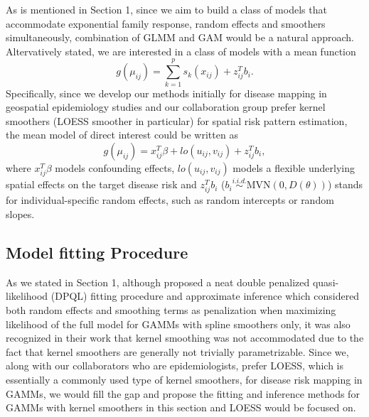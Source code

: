 	As is mentioned in Section 1, since we aim to build a class of models that accommodate exponential family response, random effects and smoothers simultaneously, combination of GLMM and GAM would be a natural approach. Altervatively stated, we are interested in a class of models with a mean function\begin{equation} \label{mod:GGAMM}
	g(\mu_{ij})=\sum_{k=1}^p s_k(x_{ij}) + z_{ij}^Tb_i.
	\end{equation} 
	Specifically, since we develop our methods initially for disease mapping in geospatial epidemiology studies and our collaboration group prefer kernel smoothers (LOESS smoother in particular) for spatial risk pattern estimation, the mean model of direct interest could be written as
	\begin{equation} \label{mod:GAMMKernel}
	g(\mu_{ij})=x_{ij}^T\beta + lo(u_{ij}, v_{ij}) + z_{ij}^Tb_i,
	\end{equation} where $x_{ij}^T\beta$ models confounding effects, $lo(u_{ij}, v_{ij})$ models a flexible underlying spatial effects on the target disease risk and $z_{ij}^Tb_i$ ($b_i \stackrel{i.i.d.}{\sim} \text{MVN}(0,D(\theta))$) stands for individual-specific random effects, such as random intercepts or random slopes. 
	
	\subsection{Model fitting Procedure} \label{s:fitting}
	As we stated in Section 1, although \cite{lin1999inference} proposed a neat double penalized quasi-likelihood (DPQL) fitting procedure and approximate inference which considered both random effects and smoothing terms as penalization when maximizing likelihood of the full model for GAMMs with spline smoothers only, it was also recognized in their work that kernel smoothing was not accommodated due to the fact that kernel smoothers are generally not trivially parametrizable. Since we, along with our collaborators who are epidemiologists, prefer LOESS, which is essentially a commonly used type of kernel smoothers, for disease risk mapping in GAMMs, we would fill the gap and propose the fitting and inference methods for GAMMs with kernel smoothers in this section and LOESS would be focused on.
	
